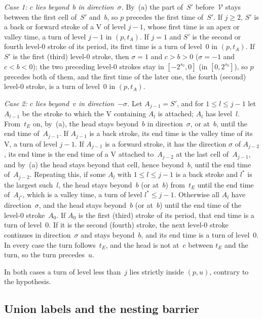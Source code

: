 \begin{informalproof}
\emph{Case 1: $c$ lies beyond~$b$ in direction~$\sigma$.} By~(a) the part of~$S'$ before~$\mathcal V$ stays between
the first cell of~$S'$ and~$b$, so $p$ precedes the first time of~$S'$. If $j\ge2$, $S'$ is a back or forward stroke
of a V of level $j-1$, whose first time is an apex or valley time, a turn of level $j-1$ in $(p,t_A)$. If $j=1$ and
$S'$ is the second or fourth level-$0$ stroke of its period, its first time is a turn of level~$0$ in $(p,t_A)$. If
$S'$ is the first (third) level-$0$ stroke, then $\sigma=1$ and $c>b>0$ ($\sigma=-1$ and $c<b<0$); the two preceding
level-$0$ strokes stay in $[-2^{s_0},0]$ (in $[0,2^{s_0}]$), so $p$ precedes both of them, and the first time of the
later one, the fourth (second) level-$0$ stroke, is a turn of level~$0$ in $(p,t_A)$.

\emph{Case 2: $c$ lies beyond~$v$ in direction~$-\sigma$.} Let $A_{j-1}=S'$, and for $1\le l\le j-1$ let $A_{l-1}$ be
the stroke to which the V containing $A_l$ is attached; $A_l$ has level~$l$. From~$t_E$ on, by~(a), the head stays
beyond~$b$ in direction~$\sigma$, or at~$b$, until the end time of~$A_{j-1}$. If $A_{j-1}$ is a back stroke, its end
time is the valley time of its V, a turn of level $j-1$. If $A_{j-1}$ is a forward stroke, it has the direction
$\sigma$ of $A_{j-2}$, its end time is the end time of a V attached to~$A_{j-2}$ at the last cell of~$A_{j-1}$, and
by~(a) the head stays beyond that cell, hence beyond~$b$, until the end time of~$A_{j-2}$. Repeating this, if some
$A_l$ with $1\le l\le j-1$ is a back stroke and $l^*$ is the largest such~$l$, the head stays beyond~$b$ (or at~$b$)
from~$t_E$ until the end time of~$A_{l^*}$, which is a valley time, a turn of level $l^*\le j-1$. Otherwise all
$A_l$ have direction~$\sigma$, and the head stays beyond~$b$ (or at~$b$) until the end time of the level-$0$
stroke~$A_0$. If $A_0$ is the first (third) stroke of its period, that end time is a turn of level~$0$. If it is the
second (fourth) stroke, the next level-$0$ stroke continues in direction~$\sigma$ and stays beyond~$b$, and its end
time is a turn of level~$0$. In every case the turn follows~$t_E$, and the head is not at~$c$ between $t_E$ and the
turn, so the turn precedes~$u$.

In both cases a turn of level less than~$j$ lies strictly inside $(p,u)$, contrary to the hypothesis.
\end{informalproof}

\subsection{Union labels and the nesting barrier}\label{sec:dep-nesting}

